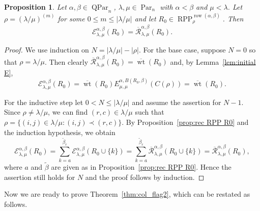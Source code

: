 \documentclass[12pt]{amsart}
\numberwithin{equation}{section}
\newtheorem{prop}[thm]{Proposition}
\theoremstyle{definition}
\newcommand\wb{\widetilde{\beta}}
\newcommand\row{\operatorname{row}}
\newcommand\Par{\operatorname{Par}}
\newcommand\QPar{\operatorname{QPar}}
\newcommand\RPP{\operatorname{RPP}}
\newcommand\lm{{\lambda/\mu}}
\newcommand\wt{\operatorname{wt}}
\newcommand\R{\mathcal{R}}
\newcommand\oR{\overline{\R}}
\newcommand\EE{\mathcal{E}}
\newcommand\owt{\overline{\wt}}
\begin{document}
\begin{prop}\label{prop:main e}
  Let $\alpha,\beta\in\QPar_n$, $\lambda,\mu\in\Par_n$ with $\alpha<\beta$ and
  $\mu<\lambda$. Let $\rho=(\lm)^{(m)}$ for some $0\le m\le|\lm|$ and let
  $R_0\in \RPP^{\row(\alpha,\beta)}_{\rho}$. Then
\[
\EE^{\alpha,\beta}_{\lambda,\mu}(R_0) = \oR^{\alpha,\beta}_{\lambda,\mu}(R_0). 
\]
\end{prop}
\begin{proof}
  We use induction on $N = |\lm|-|\rho|$. For the base case, suppose $N=0$ so
  that $\rho=\lm$. Then clearly $\oR^{\alpha,\beta}_{\lambda,\mu}(R_0) =
  \owt(R_0)$ and, by Lemma~\ref{lem:initial E}, 
  \[
\EE^{\alpha,\beta}_{\lambda,\mu}(R_0) = \owt(R_0)
E^{\alpha,B(R_0,\beta)}_{\mu,\mu}(C(\rho)) = \owt(R_0).
  \]  

  For the inductive step let $0<N\le|\lm|$ and assume the assertion for $N-1$.
  Since $\rho\ne\lm$, we can find $(r,c)\in\lm$ such that $\rho=\{(i,j)\in\lm:
  (i,j)\prec (r,c)\}$. By Proposition~\ref{prop:rec RPP R0} and the induction
  hypothesis, we obtain
\[
    \EE^{\alpha,\beta}_{\lambda,\mu}(R_0)
    = \sum_{k=a}^{\wb_r} \EE^{\alpha,\beta}_{\lambda,\mu}(R_0\cup\{k\})
    =\sum_{k=a}^{\wb_r} \oR^{\alpha,\beta}_{\lambda,\mu}(R_0\cup\{k\})
=\oR^{\alpha,\beta}_{\lambda,\mu}(R_0),
\]
where $a$ and $\wb$ are given as in Proposition~\ref{prop:rec RPP R0}.
Hence the assertion still holds for $N$ and the proof follows by induction. 
\end{proof}



Now we are ready to prove Theorem~\ref{thm:col_flag2}, which can be restated as
follows. 
\end{document}
